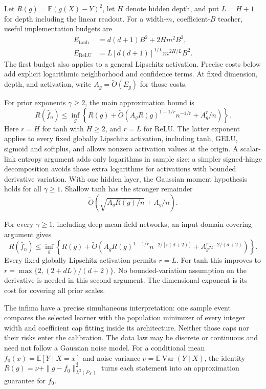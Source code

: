 \documentclass[11pt]{article}
\theoremstyle{definition}\newtheorem{definition}[theorem]{Definition}
\theoremstyle{remark}\newtheorem{remark}[theorem]{Remark}
\newcommand{\E}{\mathbb E}\newcommand{\Prob}{\mathbb P}\newcommand{\R}{\mathbb R}\newcommand{\N}{\mathbb N}
\begin{document}
Let $R(g)=\E(g(X)-Y)^2$, let $H$ denote hidden depth, and put $L=H+1$ for depth including the linear readout. For a width-$m$, coefficient-$B$ teacher, useful implementation budgets are
\begin{align}
 E_{\tanh}&=d(d+1)B^2+2Hm^2B^2,\label{eq:intro-tanh-energy}\\
 E_{\mathrm{ReLU}}&=L[d(d+1)]^{1/L}m^{2H/L}B^2.\label{eq:intro-relu-energy}
\end{align}
The first budget also applies to a general Lipschitz activation. Precise costs below add explicit logarithmic neighborhood and confidence terms. At fixed dimension, depth, and activation, write $A_g=\widetilde O(E_g)$ for those costs.

For prior exponents $\gamma\ge2$, the main approximation bound is
\begin{equation}
 R(\widehat f_n)\le\inf_g\left\{R(g)+\widetilde O\left(
 A_gR(g)^{1-1/r}n^{-1/r}+A_g^r/n\right)\right\}.
 \label{eq:intro-oracle}
\end{equation}
Here $r=H$ for tanh with $H\ge2$, and $r=L$ for ReLU. The latter exponent applies to every fixed globally Lipschitz activation, including tanh, GELU, sigmoid and softplus, and allows nonzero activation values at the origin. A scalar-link entropy argument adds only logarithms in sample size; a simpler signed-hinge decomposition avoids those extra logarithms for activations with bounded derivative variation. With one hidden layer, the Gaussian moment hypothesis holds for all $\gamma\ge1$. Shallow tanh has the stronger remainder
\begin{equation}
 \widetilde O\left(\sqrt{A_gR(g)/n}+A_g/n\right).
 \label{eq:intro-shallow}
\end{equation}

For every $\gamma\ge1$, including deep mean-field networks, an input-domain covering argument gives
\begin{equation}
 R(\widehat f_n)\le\inf_g\left\{R(g)+\widetilde O\left(
 A_gR(g)^{1-1/r}n^{-2/[r(d+2)]}
       +A_g^r n^{-2/(d+2)}\right)\right\}.
 \label{eq:intro-all-gamma}
\end{equation}
Every fixed globally Lipschitz activation permits $r=L$. For tanh this improves to
$r=\max\{2,(2+dL)/(d+2)\}$. No bounded-variation assumption on the derivative is needed in this second argument. The dimensional exponent is its cost for covering all prior scales.

The infima have a precise simultaneous interpretation: one sample event compares the selected learner with the population minimizer of every integer width and coefficient cap fitting inside its architecture. Neither those caps nor their risks enter the calibration. The data law may be discrete or continuous and need not follow a Gaussian noise model. For a conditional mean $f_0(x)=\E[Y\mid X=x]$ and noise variance $\nu=\E\operatorname{Var}(Y\mid X)$, the identity
$R(g)=\nu+\|g-f_0\|_{L^2(P_X)}^2$ turns each statement into an approximation guarantee for $f_0$.
\end{document}
